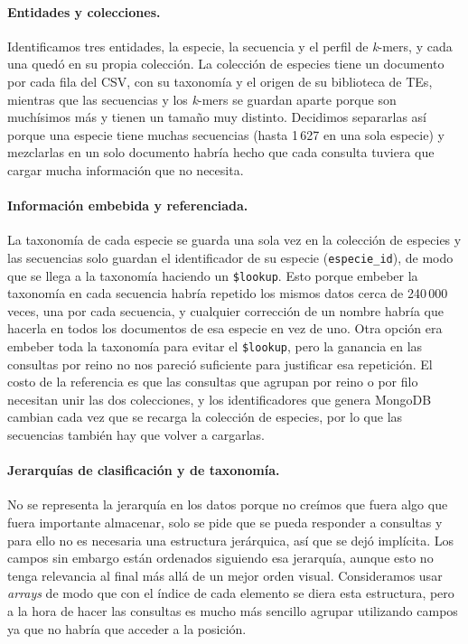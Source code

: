 \paragraph{Entidades y colecciones.}
Identificamos tres entidades, la especie, la secuencia y el perfil de
\textit{k}-mers, y cada una quedó en su propia colección. La colección de
especies tiene un documento por cada fila del CSV, con su taxonomía y el
origen de su biblioteca de TEs, mientras que las secuencias y los
\textit{k}-mers se guardan aparte porque son muchísimos más y tienen un
tamaño muy distinto. Decidimos separarlas así porque una especie tiene
muchas secuencias (hasta 1\,627 en una sola especie) y mezclarlas en un solo
documento habría hecho que cada consulta tuviera que cargar mucha
información que no necesita.

\paragraph{Información embebida y referenciada.}
La taxonomía de cada especie se guarda una sola vez en la colección de
especies y las secuencias solo guardan el identificador de su especie
(\texttt{especie\_id}), de modo que se llega a la taxonomía haciendo un
\texttt{\$lookup}. Esto porque embeber la taxonomía en cada secuencia habría
repetido los mismos datos cerca de 240\,000 veces, una por cada secuencia, y
cualquier corrección de un nombre habría que hacerla en todos los
documentos de esa especie en vez de uno. Otra opción era embeber toda la
taxonomía para evitar el \texttt{\$lookup}, pero la ganancia en las
consultas por reino no nos pareció suficiente para justificar esa
repetición. El costo de la referencia es que las consultas que agrupan por
reino o por filo necesitan unir las dos colecciones, y los identificadores
que genera MongoDB cambian cada vez que se recarga la colección de
especies, por lo que las secuencias también hay que volver a cargarlas.

\paragraph{Jerarquías de clasificación y de taxonomía.}
No se representa la jerarquía en los datos porque no creímos que fuera algo
que fuera importante almacenar, solo se pide que se pueda responder a
consultas y para ello no es necesaria una estructura jerárquica, así que se
dejó implícita. Los campos sin embargo están ordenados siguiendo esa
jerarquía, aunque esto no tenga relevancia al final más allá de un mejor
orden visual. Consideramos usar \textit{arrays} de modo que con el índice de
cada elemento se diera esta estructura, pero a la hora de hacer las
consultas es mucho más sencillo agrupar utilizando campos ya que no habría
que acceder a la posición.

